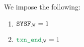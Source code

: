 We impose the following:
\begin{enumerate}
	\item $\texttt{SYSF}           _{N} = 1$
	\item $\transactionEnd _{N} = 1$
\end{enumerate}
